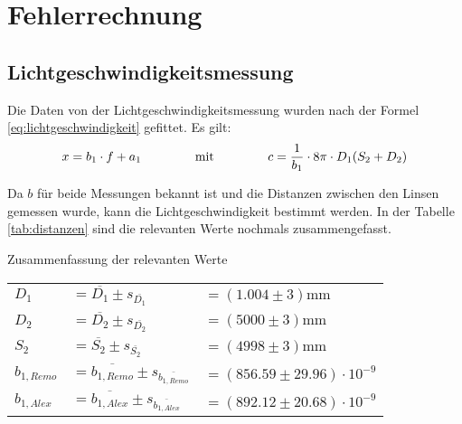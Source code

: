 \section{Fehlerrechnung}

\subsection{Lichtgeschwindigkeitsmessung}

Die  Daten  von  der   Lichtgeschwindigkeitsmessung   wurden   nach  der  Formel
\ref{eq:lichtgeschwindigkeit} gefittet. Es gilt:
\begin{equation}
    x = b_1 \cdot f + a_1 \hspace{15mm}\textrm{mit}\hspace{15mm} c = \frac{1}{b_1} \cdot 8\pi \cdot D_1(S_2+D_2)
\end{equation}

Da $b$ f\"ur beide Messungen bekannt ist und die Distanzen zwischen  den  Linsen
gemessen  wurde,  kann die Lichtgeschwindigkeit bestimmt werden. In der  Tabelle
\ref{tab:distanzen}   sind   die  relevanten  Werte  nochmals   zusammengefasst.

\begin{center}
    \begin{threeparttable}
        \caption{Zusammenfassung der relevanten Werte}
        \label{tab:distanzen}
        \begin{tabular}{llp{50mm}}
            \toprule
            $D_1$           & $= \overline{D_1} \pm s_{\overline{D_1}}$                     & $= (1.004 \pm 3)\textrm{mm}$ \\
            $D_2$           & $= \overline{D_2} \pm s_{\overline{D_2}}$                     & $= (5000 \pm 3)\textrm{mm}$ \\
            $S_2$           & $= \overline{S_2} \pm s_{\overline{S_2}}$                     & $= (4998 \pm 3)\textrm{mm}$ \\
            $b_{1,Remo}$    & $= \overline{b_{1,Remo}} \pm s_{\overline{b_{1,Remo}}}$       & $= (856.59 \pm 29.96)\cdot 10^{-9}$ \\
            $b_{1,Alex}$    & $= \overline{b_{1,Alex}} \pm s_{\overline{b_{1,Alex}}}$       & $= (892.12 \pm 20.68)\cdot 10^{-9}$ \\
            \bottomrule
        \end{tabular}
    \end{threeparttable}
\end{center}

